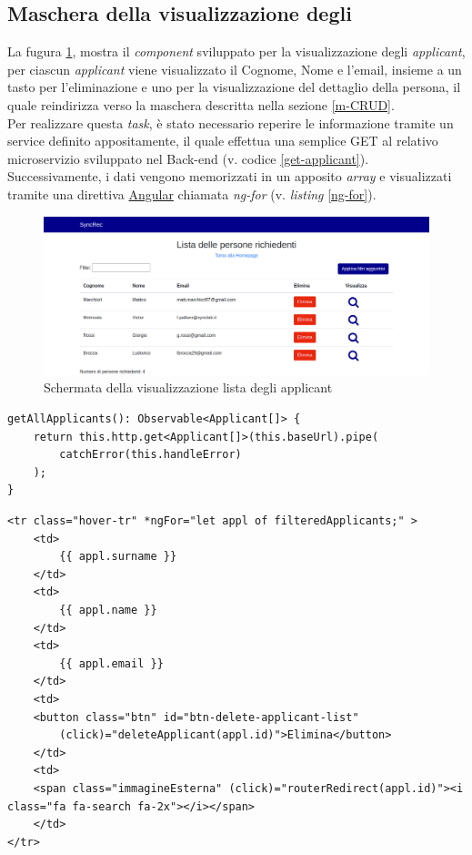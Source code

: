 \subsection{Maschera della visualizzazione degli\applicant} \label{section: applicant-list}
La fugura \ref{figura:lista}, mostra il \textit{component} sviluppato per la visualizzazione degli \textit{applicant}, per ciascun \textit{applicant} viene visualizzato il Cognome, Nome e l'email, insieme a un tasto per l'eliminazione e uno per la visualizzazione del dettaglio della persona, il quale reindirizza verso la maschera descritta nella sezione \ref{m-CRUD}.\\
Per realizzare questa \textit{task}, è stato necessario reperire le informazione tramite un service definito appositamente, il quale effettua una semplice GET al relativo microservizio sviluppato nel Back-end (v. codice \ref{get-applicant}).
Successivamente, i dati vengono memorizzati in un apposito \textit{array} e visualizzati tramite una direttiva \hyperref[angular]{Angular} chiamata \textit{ng-for} (v. \textit{listing}  \ref{ng-for}).

\vspace{0.5em}
\begin{figure}[!h] 
	\centering 
	\includegraphics[width=1\columnwidth]{immagini/svil/lista} 
	\caption{Schermata della visualizzazione lista degli applicant}
	\label{figura:lista}
\end{figure}

\begin{lstlisting}[label=get-applicant,caption=Funzione del service che effettua la chiamata GET]
getAllApplicants(): Observable<Applicant[]> {
	return this.http.get<Applicant[]>(this.baseUrl).pipe(
		catchError(this.handleError)
	);
}
\end{lstlisting} 

\begin{lstlisting}[label=ng-for,caption=Visualizzazione degli applicant nel codice HTML]
<tr class="hover-tr" *ngFor="let appl of filteredApplicants;" >
	<td>
		{{ appl.surname }}
	</td>
	<td>
		{{ appl.name }}
	</td>
	<td>
		{{ appl.email }}
	</td>
	<td>
	<button class="btn" id="btn-delete-applicant-list"
		(click)="deleteApplicant(appl.id)">Elimina</button>
	</td>
	<td>
	<span class="immagineEsterna" (click)="routerRedirect(appl.id)"><i class="fa fa-search fa-2x"></i></span>
	</td>
</tr>
\end{lstlisting} 


